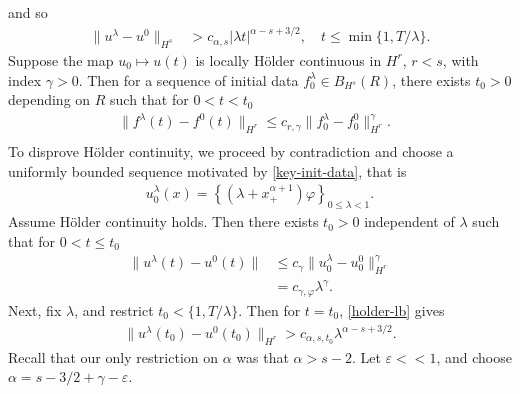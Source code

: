 \documentclass[12pt,reqno]{amsart}
\numberwithin{equation}{section}  %
\numberwithin{figure}{section}
\newcommand{\ee}{\varepsilon}
\newcommand{\vp}{\varphi}
\begin{document}
%
%
and so
\begin{equation}
    \begin{split}
    \label{holder-lb}
\| u^{\lambda} - u^{0} \|_{H^{s}} & > c_{\alpha, s} | \lambda t |^{\alpha -s +
    3/2}, \quad t \le \min \{1, T/\lambda \}.
\end{split}
\end{equation}
%
%
Suppose the map $u_{0} \mapsto u(t)$ is locally
H\"older continuous in $H^{r}$, $r<s$,
with index $\gamma > 0$. Then for a sequence of initial data $f_{0}^{\lambda} \in B_{H^{s}}(R)$, there exists $t_{0} > 0$ depending on $R$ such that for $0 < t <
t_{0}$
%
%
\begin{equation*}
\begin{split}
  \| f^{\lambda}(t) - f^{0}(t) \|_{H^{r}}
  \le c_{r, \gamma} \| f^{\lambda}_{0} - f^{0}_{0} \|_{H^{r}}^{\gamma}.
  \\
  &
\end{split}
\end{equation*}
%
%
To disprove H\"older continuity, we proceed by contradiction and choose a uniformly bounded sequence motivated by \eqref{key-init-data}, that is
%
%
\begin{equation*}
\begin{split}
  u_{0}^{\lambda}(x) = \left\{ (\lambda + x^{\alpha + 1}_{+})\vp \right\}_{0 \le
      \lambda < 1}.
\end{split}
\end{equation*}
%
%
Assume H\"older continuity holds. Then there exists $t_{0} > 0$ independent of $\lambda$ such that for $0 < t \le t_{0}$
%
%
\begin{equation}
  \label{rg}
\begin{split}
  \| u^{\lambda}(t) - u^{0}(t) \| 
  & \le c_{\gamma} \| u_{0}^{\lambda} - u^{0}_{0} \|^{\gamma}_{H^{r}}
  \\
  & = c_{\gamma, \vp} \lambda^{\gamma}.
\end{split}
\end{equation}
%
%
Next, fix $\lambda$, and restrict $t_{0} < \{1, T/\lambda \}$.
Then for $t = t_{0}$, \eqref{holder-lb} gives
%
%
\begin{equation*}
\begin{split}
  \| u^{\lambda}(t_{0}) - u^{0}(t_{0}) \|_{H^{r}} > c_{\alpha,s, t_{0}} \lambda^{\alpha - s + 3/2}.
\end{split}
\end{equation*}
%
Recall that our only restriction on $\alpha$ was that $\alpha > s-2$. 
Let $\ee <<1$, and choose $\alpha = s - 3/2 + \gamma - \ee$. 
\end{document}
